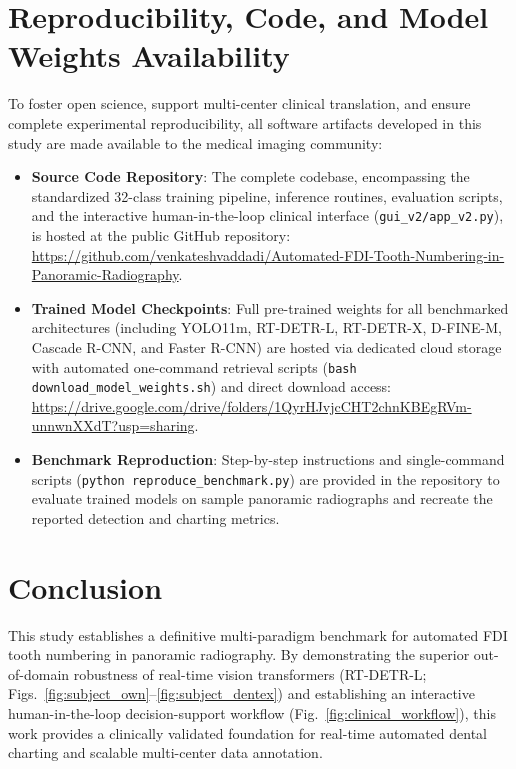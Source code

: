 \documentclass[10pt,journal,compsoc]{IEEEtran}
\begin{document}
\section{Reproducibility, Code, and Model Weights Availability}
\label{sec:availability}
To foster open science, support multi-center clinical translation, and ensure complete experimental reproducibility, all software artifacts developed in this study are made available to the medical imaging community:
\begin{itemize}
    \item \textbf{Source Code Repository}: The complete codebase, encompassing the standardized 32-class training pipeline, inference routines, evaluation scripts, and the interactive human-in-the-loop clinical interface (\texttt{gui\_v2/app\_v2.py}), is hosted at the public GitHub repository: \url{https://github.com/venkateshvaddadi/Automated-FDI-Tooth-Numbering-in-Panoramic-Radiography}.
    \item \textbf{Trained Model Checkpoints}: Full pre-trained weights for all benchmarked architectures (including YOLO11m, RT-DETR-L, RT-DETR-X, D-FINE-M, Cascade R-CNN, and Faster R-CNN) are hosted via dedicated cloud storage with automated one-command retrieval scripts (\texttt{bash download\_model\_weights.sh}) and direct download access: \url{https://drive.google.com/drive/folders/1QyrHJvjcCHT2chnKBEgRVm-unnwnXXdT?usp=sharing}.
    \item \textbf{Benchmark Reproduction}: Step-by-step instructions and single-command scripts (\texttt{python reproduce\_benchmark.py}) are provided in the repository to evaluate trained models on sample panoramic radiographs and recreate the reported detection and charting metrics.
\end{itemize}

\section{Conclusion}
\label{sec:conclusion}
This study establishes a definitive multi-paradigm benchmark for automated FDI tooth numbering in panoramic radiography. By demonstrating the superior out-of-domain robustness of real-time vision transformers (RT-DETR-L; Figs.~\ref{fig:subject_own}--\ref{fig:subject_dentex}) and establishing an interactive human-in-the-loop decision-support workflow (Fig.~\ref{fig:clinical_workflow}), this work provides a clinically validated foundation for real-time automated dental charting and scalable multi-center data annotation.
\end{document}
